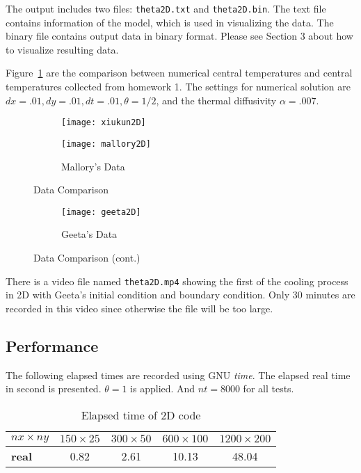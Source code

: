 \documentclass[letterpaper,12pt,fleqn]{article}
\begin{document}
The output includes two files: \texttt{theta2D.txt} and \texttt{theta2D.bin}.
The text file contains information of the model, which is used in visualizing the data.
The binary file contains output data in binary format.
Please see Section 3 about how to visualize resulting data.

Figure~\ref{fig:data-comp-2d} are the comparison between numerical central temperatures and central temperatures collected from homework 1.
The settings for numerical solution are $dx=.01, dy=.01, dt=.01, \theta=1/2$, and the thermal diffusivity $\alpha=.007$.

\begin{figure}[H]
  \begin{subfigure}[b]{\textwidth}
    \centering
    \texttt{[image: xiukun2D]}
  \end{subfigure}
  \begin{subfigure}[b]{\textwidth}
    \centering
    \texttt{[image: mallory2D]}
    \caption{Mallory's Data}
  \end{subfigure}
  \caption{Data Comparison}
\end{figure}

\begin{figure}[H]\ContinuedFloat
  \begin{subfigure}[b]{\textwidth}
    \centering
    \texttt{[image: geeta2D]}
    \caption{Geeta's Data}
  \end{subfigure}
  \caption{Data Comparison (cont.)}
  \label{fig:data-comp-2d}
\end{figure}

There is a video file named \texttt{theta2D.mp4} showing the first of the cooling process in 2D with Geeta's initial condition and boundary condition.
Only 30 minutes are recorded in this video since otherwise the file will be too large.

\subsection{Performance}
The following elapsed times are recorded using GNU \textit{time}. 
The elapsed real time in second is presented.
$\theta=1$ is applied. And $nt=8000$ for all tests.

\begin{table}[H]
  \centering
  \begin{tabular}{l c c c c }
    \toprule
    \textbf{$nx\times ny$} & $150\times 25$ & $300\times 50$ & $600\times 100$ & $1200\times 200$\\
    \midrule
    \textbf{real} & 0.82 & 2.61 & 10.13 & 48.04\\
    \bottomrule
  \end{tabular}
  \caption{Elapsed time of 2D code}
  \label{tab:time-2d}
\end{table}
\end{document}
